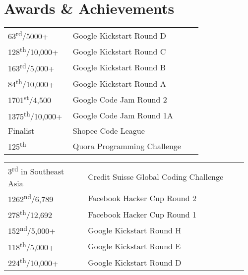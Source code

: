 \documentclass[a4paper,hidelinks]{resume} %
\begin{document}
\begin{minipage}[t]{0.54\textwidth}
    
    \sectionspace %
    
    
    
    \section{Awards \& Achievements} 
    
    \sectionspace %
    
    
    \sectionspace %
    
    \begin{tabular}{p{0.32\linewidth} p{0.64\linewidth}}
        63\textsuperscript{rd}/5000+ & {Google Kickstart Round D} \\
        128\textsuperscript{th}/10,000+ & {Google Kickstart Round C} \\
        163\textsuperscript{rd}/5,000+ & {Google Kickstart Round B} \\
        84\textsuperscript{th}/10,000+ & {Google Kickstart Round A} \\
        1701\textsuperscript{st}/4,500 & {Google Code Jam Round 2} \\
        1375\textsuperscript{th}/10,000+ & {Google Code Jam Round 1A} \\
        Finalist & {Shopee Code League} \\
        125\textsuperscript{th} & {Quora Programming Challenge} \\
    \end{tabular}
    
    \sectionspace %
    
    
    
    \sectionspace %
    
    \begin{tabular}{p{0.32\linewidth} p{0.64\linewidth}}
        3\textsuperscript{rd} in Southeast Asia & {Credit Suisse Global Coding Challenge}\\
        1262\textsuperscript{nd}/6,789 & {Facebook Hacker Cup Round 2} \\
        278\textsuperscript{th}/12,692 & {Facebook Hacker Cup Round 1} \\
        152\textsuperscript{nd}/5,000+ & {Google Kickstart Round H} \\
        118\textsuperscript{th}/5,000+ & {Google Kickstart Round E} \\
        224\textsuperscript{th}/10,000+ & {Google Kickstart Round D} \\
    \end{tabular}
    

\end{minipage}
\end{document}
